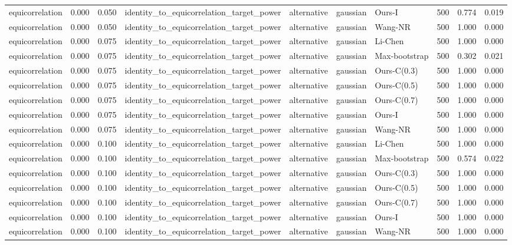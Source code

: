 \begin{tabular}{lrrllllrrr}
equicorrelation & 0.000 & 0.050 & identity\_to\_equicorrelation\_target\_power & alternative & gaussian & Ours-I & 500 & 0.774 & 0.019 \\
equicorrelation & 0.000 & 0.050 & identity\_to\_equicorrelation\_target\_power & alternative & gaussian & Wang-NR & 500 & 1.000 & 0.000 \\
equicorrelation & 0.000 & 0.075 & identity\_to\_equicorrelation\_target\_power & alternative & gaussian & Li-Chen & 500 & 1.000 & 0.000 \\
equicorrelation & 0.000 & 0.075 & identity\_to\_equicorrelation\_target\_power & alternative & gaussian & Max-bootstrap & 500 & 0.302 & 0.021 \\
equicorrelation & 0.000 & 0.075 & identity\_to\_equicorrelation\_target\_power & alternative & gaussian & Ours-C(0.3) & 500 & 1.000 & 0.000 \\
equicorrelation & 0.000 & 0.075 & identity\_to\_equicorrelation\_target\_power & alternative & gaussian & Ours-C(0.5) & 500 & 1.000 & 0.000 \\
equicorrelation & 0.000 & 0.075 & identity\_to\_equicorrelation\_target\_power & alternative & gaussian & Ours-C(0.7) & 500 & 1.000 & 0.000 \\
equicorrelation & 0.000 & 0.075 & identity\_to\_equicorrelation\_target\_power & alternative & gaussian & Ours-I & 500 & 1.000 & 0.000 \\
equicorrelation & 0.000 & 0.075 & identity\_to\_equicorrelation\_target\_power & alternative & gaussian & Wang-NR & 500 & 1.000 & 0.000 \\
equicorrelation & 0.000 & 0.100 & identity\_to\_equicorrelation\_target\_power & alternative & gaussian & Li-Chen & 500 & 1.000 & 0.000 \\
equicorrelation & 0.000 & 0.100 & identity\_to\_equicorrelation\_target\_power & alternative & gaussian & Max-bootstrap & 500 & 0.574 & 0.022 \\
equicorrelation & 0.000 & 0.100 & identity\_to\_equicorrelation\_target\_power & alternative & gaussian & Ours-C(0.3) & 500 & 1.000 & 0.000 \\
equicorrelation & 0.000 & 0.100 & identity\_to\_equicorrelation\_target\_power & alternative & gaussian & Ours-C(0.5) & 500 & 1.000 & 0.000 \\
equicorrelation & 0.000 & 0.100 & identity\_to\_equicorrelation\_target\_power & alternative & gaussian & Ours-C(0.7) & 500 & 1.000 & 0.000 \\
equicorrelation & 0.000 & 0.100 & identity\_to\_equicorrelation\_target\_power & alternative & gaussian & Ours-I & 500 & 1.000 & 0.000 \\
equicorrelation & 0.000 & 0.100 & identity\_to\_equicorrelation\_target\_power & alternative & gaussian & Wang-NR & 500 & 1.000 & 0.000 \\
\bottomrule
\end{tabular}
